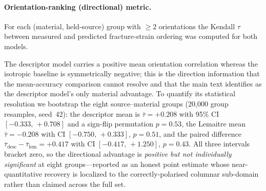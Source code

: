 \documentclass[12pt,a4paper,twocolumn]{article}
\begin{document}
\paragraph{Orientation-ranking (directional) metric.}
For each (material, held-source) group with $\ge 2$ orientations the Kendall $\tau$ between measured and
predicted fracture-strain ordering was computed for both models.

\begin{table}[htbp]
\centering
\caption{Per-group Kendall orientation-ordering correlation (positive = measured ductility order recovered).
Descriptor mean $\bar\tau = +0.208$ (median $+0.333$), Spearman mean $+0.25$, monotone $0^\circ\!>\!45^\circ\!>\!90^\circ$
hits $6/6$; Lemaitre mean $\bar\tau = -0.208$ (median $-0.333$), i.~e.\ a tendency to reverse the order.}
\label{tab:si_ranking}
\footnotesize
\setlength{\tabcolsep}{4pt}
\end{table}

The descriptor model carries a positive mean orientation correlation whereas the isotropic baseline is
symmetrically negative; this is the direction information that the mean-accuracy comparison cannot resolve and
that the main text identifies as the descriptor model's only material advantage. To quantify its statistical
resolution we bootstrap the eight source--material groups (20{,}000 group resamples, seed~42): the descriptor mean
is $\bar\tau = +0.208$ with 95\% CI $[-0.333,\,+0.708]$ and a sign-flip permutation $p = 0.53$, the Lemaitre mean
$\bar\tau = -0.208$ with CI $[-0.750,\,+0.333]$, $p = 0.51$, and the paired difference
$\bar\tau_{\mathrm{desc}} - \bar\tau_{\mathrm{lem}} = +0.417$ with CI $[-0.417,\,+1.250]$, $p = 0.43$. All three
intervals bracket zero, so the directional advantage is \emph{positive but not individually significant} at eight
groups---reported as an honest point estimate whose near-quantitative recovery is localized to the
correctly-polarised columnar sub-domain rather than claimed across the full set.
\end{document}
